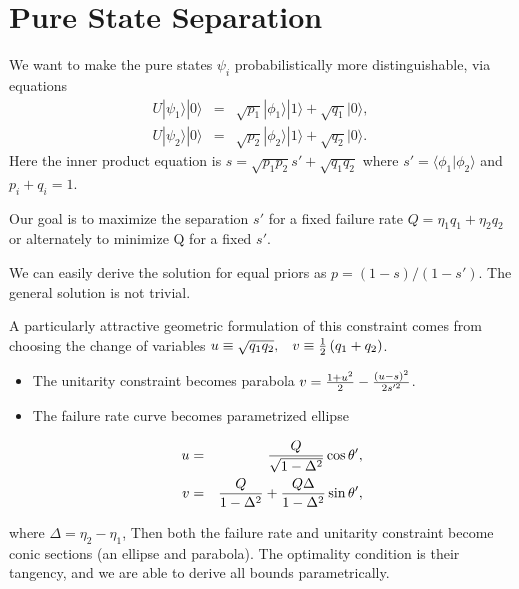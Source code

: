 \documentclass{beamer}
\newcommand{\ke}[1]{|#1\rangle}
\newcommand{\bk}[2]{\langle #1|#2\rangle}
\begin{document}
\section{Pure State Separation}
\begin{frame}
We want to make the pure states $\psi_i$ probabilistically more distinguishable, via
equations
\begin{eqnarray*}
U|\psi_{1}\rangle|0\rangle & = & \sqrt{p_{1}}|\phi_{1}\rangle|1\rangle+\sqrt{q_{1}}\ke 0,\nonumber \\
U|\psi_{2}\rangle|0\rangle & = & \sqrt{p_{2}}|\phi_{2}\rangle|1\rangle+\sqrt{q_{2}}\ke 0.
\end{eqnarray*}
Here the inner product equation is $s = \sqrt{p_1 p_2} s' + \sqrt{q_1 q_2}$ where $s' = \bk{\phi_1}{\phi_2}$ and $p_i + q_i =1$.

Our goal is to maximize the separation $s'$ for a fixed failure rate $Q = \eta_1 q_1 + \eta_2 q_2$ or alternately to minimize Q for a fixed $s'$.

We can easily derive the solution for equal priors as $p = (1-s)/(1-s')$. The general solution is not trivial.
\end{frame}
\begin{frame}
A particularly attractive geometric formulation of this constraint comes from
choosing the change of variables 
$u\equiv\sqrt{q_{1}q_{2}},\hspace{0.3cm}v\equiv\frac{1}{2}\left(q_{1}+q_{2}\right)$.
\begin{itemize}
\item
The unitarity constraint becomes parabola $v={1+u^2\over2}-{(u-s)^2\over2s'^2}$.
\item
The failure rate curve becomes parametrized ellipse

\begin{eqnarray}
u&=&{Q\over\sqrt{1-\Delta^2}}\cos\theta',\nonumber\\
v&=&{Q\over1-\Delta^2}+{Q\Delta\over1-\Delta^2}\sin\theta',
\end{eqnarray}
\end{itemize}
where $\Delta = \eta_2 - \eta_1$,
Then both the failure rate and unitarity constraint become conic sections (an ellipse and parabola).  The optimality
condition is their tangency, and we are able to derive all bounds parametrically.
\end{frame}
\end{document}

